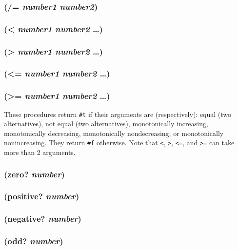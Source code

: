 \documentclass{article}
\begin{document}
\subsubsection{(/= \emph{number1} \emph{number2})}

\subsubsection{(\textless{} \emph{number1} \emph{number2} \ldots{})}

\subsubsection{(\textgreater{} \emph{number1} \emph{number2} \ldots{})}

\subsubsection{(\textless{}= \emph{number1} \emph{number2} \ldots{})}

\subsubsection{(\textgreater{}= \emph{number1} \emph{number2} \ldots{})}

These procedures return \verb|#t| if their arguments are (respectively): equal (two
alternatives), not equal (two alternatives), monotonically increasing, monotonically
decreasing, monotonically nondecreasing, or monotonically nonincreasing. They return
\verb|#f| otherwise. Note that \verb|<|, \verb|>|, \verb|<=|, and
\verb|>=| can take more than 2 arguments.

\subsubsection{(zero? \emph{number})}

\subsubsection{(positive? \emph{number})}

\subsubsection{(negative? \emph{number})}

\subsubsection{(odd? \emph{number})}
\end{document}
